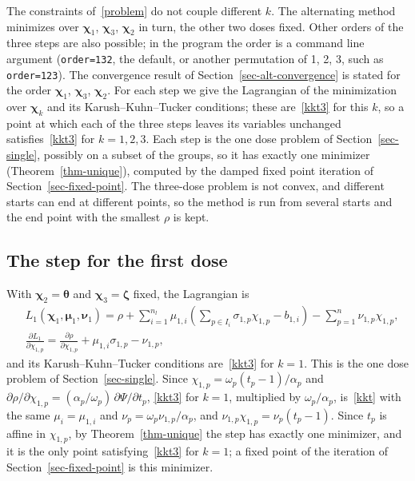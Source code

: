 \documentclass[11pt]{article}
\theoremstyle{plain}
\theoremstyle{remark}
\numberwithin{equation}{section}
\begin{document}
The constraints of~\eqref{problem} do not couple different $k$. The
alternating method minimizes over $\bm\chi_1$, $\bm\chi_3$, $\bm\chi_2$ in
turn, the other two doses fixed. Other orders of the three steps are also possible; in the
program the order is a command line argument (\texttt{order=132}, the default, or another
permutation of 1, 2, 3, such as \texttt{order=123}). The convergence result of
Section~\ref{sec-alt-convergence} is stated for the order $\bm\chi_1$, $\bm\chi_3$,
$\bm\chi_2$. For each step we give the Lagrangian of the
minimization over $\bm\chi_k$ and its Karush--Kuhn--Tucker conditions; these
are~\eqref{kkt3} for this $k$, so a point at which each of the three steps
leaves its variables unchanged satisfies~\eqref{kkt3} for $k=1,2,3$. Each step
is the one dose problem of Section~\ref{sec-single}, possibly on a subset of the
groups, so it has exactly one minimizer (Theorem~\ref{thm-unique}), computed by
the damped fixed point iteration of Section~\ref{sec-fixed-point}. The
three-dose problem is not convex, and different starts can end at different
points, so the method is run from several starts and the end point with the
smallest $\rho$ is kept.

\subsection{The step for the first dose}\label{sec-step1}
With $\bm\chi_2=\bm\theta$ and $\bm\chi_3=\bm\zeta$ fixed, the Lagrangian is
\begin{equation}\label{lagrangian1}
\begin{aligned}
&L_1(\bm\chi_1,\bm\mu_1,\bm\nu_1)=\rho
+\sum_{i=1}^{n_l}\mu_{1,i}\left(\sum_{p\in I_i}\sigma_{1,p}\chi_{1,p}-b_{1,i}\right)
-\sum_{p=1}^n\nu_{1,p}\chi_{1,p},\\
&\frac{\partial L_1}{\partial\chi_{1,p}}=\frac{\partial\rho}{\partial\chi_{1,p}}
+\mu_{1,i}\sigma_{1,p}-\nu_{1,p},
\end{aligned}
\end{equation}
and its Karush--Kuhn--Tucker conditions are~\eqref{kkt3} for $k=1$. This is
the one dose problem of Section~\ref{sec-single}. Since
$\chi_{1,p}=\omega_p(t_p-1)/\alpha_p$ and
$\partial\rho/\partial\chi_{1,p}=(\alpha_p/\omega_p)\,\partial\Psi/\partial t_p$,
\eqref{kkt3} for $k=1$, multiplied by $\omega_p/\alpha_p$, is~\eqref{kkt} with the
same $\mu_i=\mu_{1,i}$ and $\nu_p=\omega_p\nu_{1,p}/\alpha_p$, and
$\nu_{1,p}\chi_{1,p}=\nu_p(t_p-1)$. Since $t_p$ is affine in $\chi_{1,p}$, by
Theorem~\ref{thm-unique} the step has exactly one minimizer, and it is the only
point satisfying~\eqref{kkt3} for $k=1$; a fixed point of the iteration of
Section~\ref{sec-fixed-point} is this minimizer.
\end{document}
